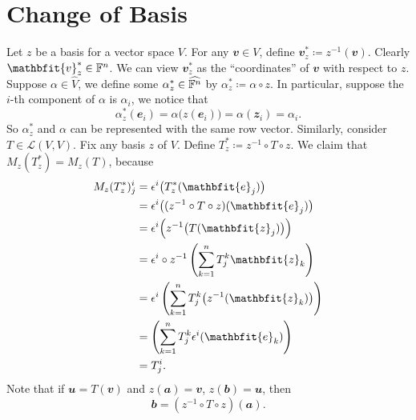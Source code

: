 \documentclass[math, code]{amznotes}
\theoremstyle{remark}
\begin{document}
\section{Change of Basis}\label{sectionChangeBasis}
Let $z$ be a basis for a vector space $V$. For any $\mathbfit{v} \in V$, define $\mathbfit{v}^*_z \coloneqq z^{-1}(\mathbfit{v})$. Clearly $\mathbfit{v}^*_z \in \F^n$. We can view $\mathbfit{v}^*_z$ as the ``coordinates'' of $\mathbfit{v}$ with respect to $z$. Suppose $\alpha \in \widehat{V}$, we define some $\alpha^*_z \in \widehat{\mathbb{F}^n}$ by $\alpha^*_z \coloneqq \alpha \circ z$. In particular, suppose the $i$-th component of $\alpha$ is $\alpha_i$, we notice that
\begin{equation*}
    \alpha^*_z(\mathbfit{e}_i) = \alpha\bigl(z(\mathbfit{e}_i)\bigr) = \alpha(\mathbfit{z}_i) = \alpha_i.
\end{equation*}
So $\alpha^*_z$ and $\alpha$ can be represented with the same row vector. Similarly, consider $T \in \mathcal{L}(V, V)$. Fix any basis $z$ of $V$. Define $T^*_z \coloneqq z^{-1} \circ T \circ z$. We claim that $M_z(T^*_z) = M_z(T)$, because
\begin{align*}
    M_z(T^*_z)^i_j & = \epsilon^i\bigl(T^*_z(\mathbfit{e}_j)\bigr) \\
    & = \epsilon^i\bigl((z^{-1} \circ T \circ z)(\mathbfit{e}_j)\bigr) \\
    & = \epsilon^i\Bigl(z^{-1}\bigl(T(\mathbfit{z}_j)\bigr)\Bigr) \\
    & = \epsilon^i \circ z^{-1}\left(\sum_{k = 1}^{n}T^k_j\mathbfit{z}_k\right) \\
    & = \epsilon^i\left(\sum_{k = 1}^{n}T^k_j\bigl(z^{-1}(\mathbfit{z}_k)\bigr)\right) \\
    & = \left(\sum_{k = 1}^{n}T^k_j\epsilon^i(\mathbfit{e}_k)\right) \\
    & = T^i_j.
\end{align*}
Note that if $\mathbfit{u} = T(\mathbfit{v})$ and $z(\mathbfit{a}) = \mathbfit{v}$, $z(\mathbfit{b}) = \mathbfit{u}$, then 
\begin{equation*}
    \mathbfit{b} = \left(z^{-1} \circ T \circ z\right)(\mathbfit{a}).
\end{equation*}
\end{document}
